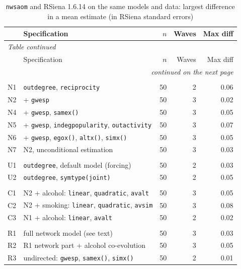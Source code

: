 {\footnotesize
\begin{longtable}{l>{\raggedright\arraybackslash}p{}rrr}
\caption{\texttt{nwsaom} and RSiena 1.6.14 on the same models and data: largest difference in a mean estimate (in RSiena standard errors)}\label{tab:bench}\\
\toprule
 & Specification & $n$ & Waves & Max diff \\
\midrule
\endfirsthead
\multicolumn{5}{l}{\textit{Table \thetable{} continued}}\\
\toprule
 & Specification & $n$ & Waves & Max diff \\
\midrule
\endhead
\midrule
\multicolumn{5}{r}{\textit{continued on the next page}}\\
\endfoot
\bottomrule
\endlastfoot
\multicolumn{5}{l}{\textit{Network}} \\
N1 & \texttt{outdegree}, \texttt{reciprocity} & 50 & 2 & 0.06 \\
N2 & + \texttt{gwesp} & 50 & 3 & 0.02 \\
N4 & + \texttt{gwesp}, \texttt{samex()} & 50 & 3 & 0.05 \\
N5 & + \texttt{gwesp}, \texttt{indegpopularity}, \texttt{outactivity} & 50 & 3 & 0.07 \\
N6 & + \texttt{gwesp}, \texttt{egox()}, \texttt{altx()}, \texttt{simx()} & 50 & 3 & 0.05 \\
N7 & N2, unconditional estimation & 50 & 3 & 0.03 \\
\addlinespace
\multicolumn{5}{l}{\textit{Undirected}} \\
U1 & \texttt{outdegree}, default model (forcing) & 50 & 2 & 0.03 \\
U2 & \texttt{outdegree}, \texttt{symtype(joint)} & 50 & 2 & 0.05 \\
\addlinespace
\multicolumn{5}{l}{\textit{Co-evolution}} \\
C1 & N2 + alcohol: \texttt{linear}, \texttt{quadratic}, \texttt{avalt} & 50 & 3 & 0.05 \\
C2 & N2 + smoking: \texttt{linear}, \texttt{quadratic}, \texttt{avsim} & 50 & 3 & 0.08 \\
C3 & N1 + alcohol: \texttt{linear}, \texttt{avalt} & 50 & 2 & 0.02 \\
\addlinespace
\multicolumn{5}{l}{\textit{Realistic}} \\
R1 & full network model (see text) & 50 & 3 & 0.03 \\
R2 & R1 network part + alcohol co-evolution & 50 & 3 & 0.05 \\
R3 & undirected: \texttt{gwesp}, \texttt{samex()}, \texttt{simx()} & 50 & 2 & 0.01 \\

\end{longtable}}

